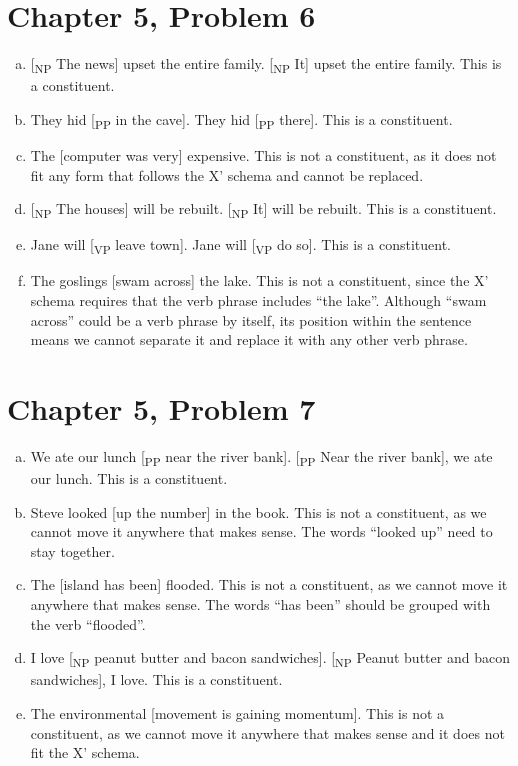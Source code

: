 \documentclass[12pt]{article}
\begin{document}
\section*{Chapter 5, Problem 6}

\begin{enumerate}[a)]
    \item {[\textsubscript{NP} The news] upset the entire family. [\textsubscript{NP} It] upset the entire family. This is a constituent.}
    \item They hid [\textsubscript{PP} in the cave]. They hid [\textsubscript{PP} there]. This is a constituent.
    \item The [computer was very] expensive. This is not a constituent, as it does not fit any form that follows the X' schema and cannot be replaced.
    \item {[\textsubscript{NP} The houses] will be rebuilt. [\textsubscript{NP} It] will be rebuilt. This is a constituent.}
    \item Jane will [\textsubscript{VP} leave town]. Jane will [\textsubscript{VP} do so]. This is a constituent.
    \item The goslings [swam across] the lake. This is not a constituent, since the X' schema requires that the verb phrase includes ``the lake''.
    Although ``swam across'' could be a verb phrase by itself, its position within the sentence means we cannot separate it and replace it with any other verb phrase.
\end{enumerate}

\section*{Chapter 5, Problem 7}

\begin{enumerate}[a)]
    \item We ate our lunch [\textsubscript{PP} near the river bank]. [\textsubscript{PP} Near the river bank], we ate our lunch. This is a constituent.
    \item Steve looked [up the number] in the book. This is not a constituent, as we cannot move it anywhere that makes sense. The words ``looked up'' need to stay together.
    \item The [island has been] flooded. This is not a constituent, as we cannot move it anywhere that makes sense. The words ``has been'' should be grouped with the verb ``flooded''.
    \item I love [\textsubscript{NP} peanut butter and bacon sandwiches]. [\textsubscript{NP} Peanut butter and bacon sandwiches], I love. This is a constituent.
    \item The environmental [movement is gaining momentum]. This is not a constituent, as we cannot move it anywhere that makes sense and it does not fit the X' schema.
\end{enumerate}
\end{document}
